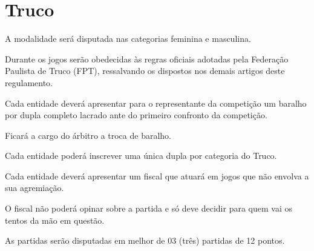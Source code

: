 {\let\clearpage\relax \chapter{Truco}}

\begin{article}
	A modalidade será disputada nas categorias feminina e masculina.
\end{article}

\begin{article}
	Durante os jogos serão obedecidas às regras oficiais adotadas pela Federação Paulista de Truco (FPT), ressalvando os dispostos nos demais artigos deste regulamento.
\end{article}

\begin{article}
	Cada entidade deverá apresentar para o representante da competição um baralho por dupla completo lacrado ante do primeiro confronto da competição.

	\begin{xparagraph}
		Ficará a cargo do árbitro a troca de baralho.
	\end{xparagraph}
\end{article}

\begin{article}
	Cada entidade poderá inscrever uma única dupla por categoria do Truco.
\end{article}

\begin{article}
	Cada entidade deverá apresentar um fiscal que atuará em jogos que não envolva a sua agremiação.

	\begin{xparagraph}
		O fiscal não poderá opinar sobre a partida e só deve decidir para quem vai os tentos da mão em questão.
	\end{xparagraph}
\end{article}

\begin{article}
	As partidas serão disputadas em melhor de 03 (três) partidas de 12 pontos.
\end{article}

